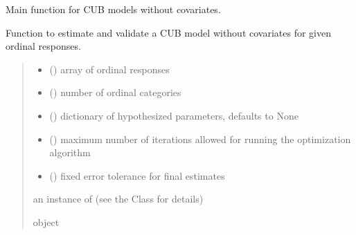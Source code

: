 \documentclass[letterpaper,10pt,english]{sphinxmanual}
\begin{document}
\begin{fulllineitems}
\label{\detokenize{cubmods:cubmods.cub.mle}}
\pysigstartsignatures
{}
\pysigstopsignatures
\sphinxAtStartPar
Main function for CUB models without covariates.

\sphinxAtStartPar
Function to estimate and validate a CUB model without covariates for given ordinal responses.
\begin{quote}\begin{description}
\begin{itemize}
\item {} 
\sphinxAtStartPar
{} () \textendash{} array of ordinal responses

\item {} 
\sphinxAtStartPar
{} () \textendash{} number of ordinal categories

\item {} 
\sphinxAtStartPar
{} (\sphinxstyleliteralemphasis{\sphinxupquote{, }}) \textendash{} dictionary of hypothesized parameters, defaults to None

\item {} 
\sphinxAtStartPar
{} () \textendash{} maximum number of iterations allowed for running the optimization algorithm

\item {} 
\sphinxAtStartPar
{} () \textendash{} fixed error tolerance for final estimates

\end{itemize}

\sphinxAtStartPar
an instance of  (see the Class for details)

\sphinxAtStartPar
object

\end{description}\end{quote}

\end{fulllineitems}
\end{document}
